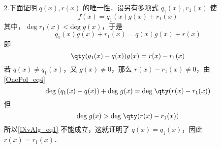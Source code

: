 2.下面证明 $q(x),r(x)$ 的唯一性．设另有多项式 $q_1(x),r_1(x)$ 使
\begin{equation}
f(x)=q_1(x)g(x)+r_1(x)
\end{equation}
其中， $\mathrm{deg}\;r_1(x)<\mathrm{deg}\;g(x)$，于是
\begin{equation}
q_1(x)g(x)+r_1(x)=q(x)g(x)+r(x)
\end{equation}
即
\begin{equation}
\qty(q_1(x)-q(x))g(x)=r(x)-r_1(x)
\end{equation}
若 $q(x)\neq q_1(x)$，又 $g(x)\neq 0$，那么 $r(x)-r_1(x)\neq 0$，由\autoref{OnePol_eq4}~
\begin{equation}\label{DivAlg_eq1}
\mathrm{deg}\;(q_1(x)-q(x))+\mathrm{deg}\;g(x)=\mathrm{deg}\;\qty(r(x)-r_1(x))
\end{equation}
但
\begin{equation}
\mathrm{deg}\;g(x)>\mathrm{deg}\;\qty(r(x)-r_1(x))
\end{equation}
所以\autoref{DivAlg_eq1} 不能成立，这就证明了
$q(x)=q_1(x)$，因此 $r(x)=r_1(x)$．
